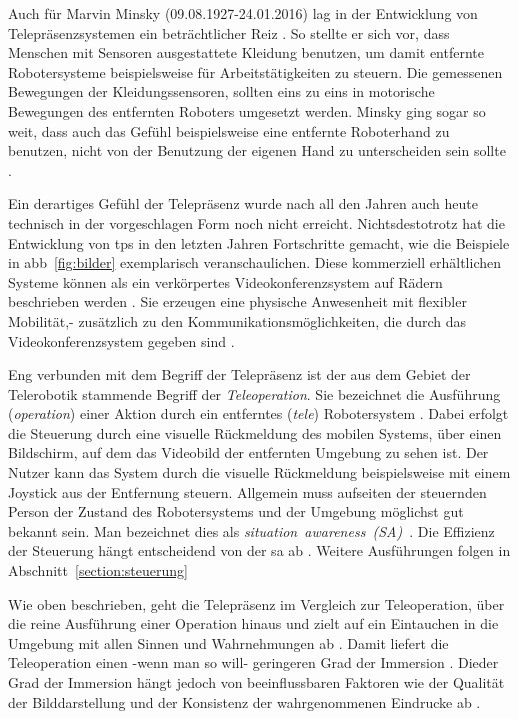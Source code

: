 Auch für Marvin Minsky (09.08.1927-24.01.2016) lag in der Entwicklung von Telepräsenzsystemen ein beträchtlicher Reiz \cite{Minsky1980}. So stellte er sich vor, dass Menschen mit Sensoren ausgestattete Kleidung benutzen, um damit entfernte Robotersysteme beispielsweise für Arbeitstätigkeiten zu steuern. Die gemessenen Bewegungen der Kleidungssensoren, sollten eins zu eins in motorische Bewegungen des entfernten Roboters umgesetzt werden. Minsky ging sogar so weit, dass auch das Gefühl beispielsweise eine entfernte Roboterhand zu benutzen, nicht von der Benutzung der eigenen Hand zu unterscheiden sein sollte \cite{Minsky1980}. 

Ein derartiges Gefühl der Telepräsenz wurde nach all den Jahren auch heute technisch in der vorgeschlagen Form noch nicht erreicht. Nichtsdestotrotz hat die Entwicklung von \acl{tps} in den letzten Jahren Fortschritte gemacht, wie die Beispiele in \acs{abb}~\ref{fig:bilder} exemplarisch veranschaulichen. Diese kommerziell erhältlichen Systeme können als ein verkörpertes Videokonferenzsystem auf Rädern beschrieben werden \cite{Tsui2011b}. Sie erzeugen eine physische Anwesenheit mit flexibler Mobilität,- zusätzlich zu den Kommunikationsmöglichkeiten, die durch das Videokonferenzsystem gegeben sind \cite{Tsui2011b}.

Eng verbunden mit dem Begriff der Telepräsenz ist der aus dem Gebiet der Telerobotik stammende Begriff der \textit{Teleoperation}. Sie bezeichnet die Ausführung (\textit{operation}) einer Aktion durch ein entferntes (\textit{tele}) Robotersystem \cite{Rossler2009}. Dabei erfolgt die Steuerung durch eine visuelle Rückmeldung des mobilen Systems, \zB über einen Bildschirm, auf dem das Videobild der entfernten Umgebung zu sehen ist. Der Nutzer kann das System durch die visuelle Rückmeldung beispielsweise mit einem Joystick aus der Entfernung steuern.  Allgemein muss aufseiten der steuernden Person der Zustand des Robotersystems und der Umgebung möglichst gut bekannt sein. Man bezeichnet dies als \textit{situation~awareness~(SA)}~\cite{Drury2003,Yanco2004-2}. Die Effizienz der Steuerung hängt entscheidend von der \acs{sa} ab \cite{Drury2003,Yanco2004-2}. Weitere Ausführungen folgen in Abschnitt~\ref{section:steuerung}

Wie oben beschrieben, geht die Telepräsenz im Vergleich zur Teleoperation, über die reine Ausführung einer Operation hinaus und zielt auf ein Eintauchen in die Umgebung mit allen Sinnen und Wahrnehmungen ab \cite{Rossler2009}. Damit liefert die Teleoperation einen -wenn man so will- geringeren Grad der Immersion \cite{Rossler2009}. Dieder Grad der Immersion hängt jedoch von beeinflussbaren Faktoren wie \zB der Qualität der Bilddarstellung und der Konsistenz der wahrgenommenen Eindrucke ab \cite{Rossler2009,Peters2013}.

